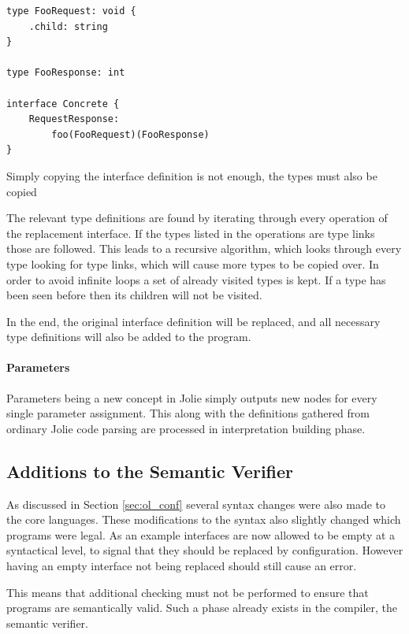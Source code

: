 \begin{listing}[H]
\begin{verbatim}
type FooRequest: void {
    .child: string
}

type FooResponse: int

interface Concrete {
    RequestResponse:
        foo(FooRequest)(FooResponse)
}
\end{verbatim}

\caption{Simply copying the interface definition is not enough, the types must
    also be copied}

\label{lst:interface_rebinding_types}
\end{listing}

The relevant type definitions are found by iterating through every operation of
the replacement interface. If the types listed in the operations are type links
those are followed. This leads to a recursive algorithm, which looks through
every type looking for type links, which will cause more types to be copied
over. In order to avoid infinite loops a set of already visited types is kept.
If a type has been seen before then its children will not be visited.

In the end, the original interface definition will be replaced, and all
necessary type definitions will also be added to the program.

\paragraph{Parameters}

Parameters being a new concept in Jolie simply outputs new nodes for every
single parameter assignment. This along with the definitions gathered from
ordinary Jolie code parsing are processed in interpretation building phase.

\subsection{Additions to the Semantic Verifier}

As discussed in Section \ref{sec:ol_conf} several syntax changes were also made
to the core languages. These modifications to the syntax also slightly changed
which programs were legal. As an example interfaces are now allowed to be empty
at a syntactical level, to signal that they should be replaced by
configuration. However having an empty interface not being replaced should
still cause an error.

This means that additional checking must not be performed to ensure that
programs are semantically valid. Such a phase already exists in the compiler,
the semantic verifier.

